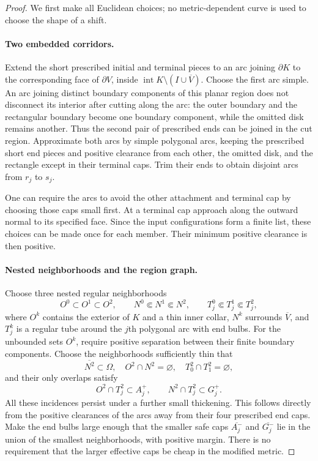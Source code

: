 \begin{proof}
We first make all Euclidean choices; no metric-dependent
curve is used to choose the shape of a shift.

\paragraph{Two embedded corridors.}
Extend the short prescribed initial and terminal pieces to
an arc joining $\partial K$ to the corresponding face of
$\partial V$, inside
$\operatorname{int}K\setminus(I\cup\overline V)$.
Choose the first arc simple.  An arc joining distinct
boundary components of this planar region does not
disconnect its interior after cutting along the arc: the
outer boundary and the rectangular boundary become one
boundary component, while the omitted disk remains another.
Thus the second pair of prescribed ends can be joined in
the cut region.  Approximate both arcs by simple polygonal
arcs, keeping the prescribed short end pieces and positive
clearance from each other, the omitted disk, and the
rectangle except in their terminal caps.  Trim their ends
to obtain disjoint arcs from $r_j$ to $s_j$.

One can require the arcs to avoid the other attachment and
terminal cap by choosing those caps small first.  At a
terminal cap approach along the outward normal to its
specified face.  Since the input configurations form a
finite list, these choices can be made once for each member.
Their minimum positive clearance is then positive.

\paragraph{Nested neighborhoods and the region graph.}
Choose three nested regular neighborhoods
\[
 O^0\subset O^1\subset O^2,\qquad
 N^0\Subset N^1\Subset N^2,\qquad
 T_j^0\Subset T_j^1\Subset T_j^2,
\]
where $O^k$ contains the exterior of $K$ and a thin inner
collar, $N^k$ surrounds $\overline V$, and $T_j^k$ is a
regular tube around the $j$th polygonal arc with end bulbs.
For the unbounded sets $O^k$, require positive separation
between their finite boundary components.
Choose the neighborhoods sufficiently thin that
\[
 \overline{N^2}\subset\Omega,\quad
 O^2\cap N^2=\varnothing,\quad
 T_0^2\cap T_1^2=\varnothing,
\]
and their only overlaps satisfy
\[
 O^2\cap T_j^2\subset A_j^+,
 \qquad N^2\cap T_j^2\subset G_j^+.
\]
All these incidences persist under a further small thickening.
This follows directly from the positive clearances of the
arcs away from their four prescribed end caps.  Make the
end bulbs large enough that the smaller safe caps
$\overline{A_j^-}$ and $\overline{G_j^-}$ lie in the union
of the smallest neighborhoods, with positive margin.
There is no requirement that the larger effective caps be
cheap in the modified metric.


\end{proof}
